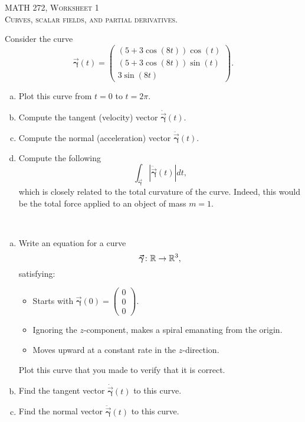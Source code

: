 \documentclass[12pt]{article} %
\newcommand{\curvegamma}{\boldsymbol{\vec{\gamma}}}
\newcommand{\tangentgamma}{\boldsymbol{\dot{\vec{\gamma}}}}
\newcommand{\normalgamma}{\boldsymbol{\ddot{\vec{\gamma}}}}
\begin{document}
\begin{center}
   \textsc{\large MATH 272, Worksheet 1}\\
   \textsc{Curves, scalar fields, and partial derivatives.}
\end{center}
\vspace{.5cm}

\begin{problem}
    Consider the curve 
    \[
    \curvegamma(t) = \begin{pmatrix} (5+3\cos(8t))\cos(t) \\ (5+3\cos(8t))\sin(t) \\ 3\sin(8t) \end{pmatrix}.
    \]
    \begin{enumerate}[(a)]
        \item Plot this curve from $t=0$ to $t=2\pi$.
        \item Compute the tangent (velocity) vector $\tangentgamma(t)$.
        \item Compute the normal (acceleration) vector $\normalgamma(t)$.
        \item Compute the following 
        \[
        \int_{\curvegamma} \left| \normalgamma(t) \right| dt,
        \]
        which is closely related to the total curvature of the curve.  Indeed, this would be the total force applied to an object of mass $m=1$.
    \end{enumerate}
\end{problem}

\begin{problem}~
\begin{enumerate}[(a)]
\item Write an equation for a curve
\[
\curvegamma \colon \R \to \R^3,
\]
satisfying:
\begin{itemize}
    \item Starts with $\curvegamma(0)=\begin{pmatrix} 0 \\ 0 \\ 0 \end{pmatrix}$.
    \item Ignoring the $z$-component, makes a spiral emanating from the origin.
    \item Moves upward at a constant rate in the $z$-direction.
\end{itemize}
Plot this curve that you made to verify that it is correct.
\item Find the tangent vector $\tangentgamma(t)$ to this curve.
\item Find the normal vector $\normalgamma(t)$ to this curve.
\end{enumerate}
\end{problem}
\end{document}
